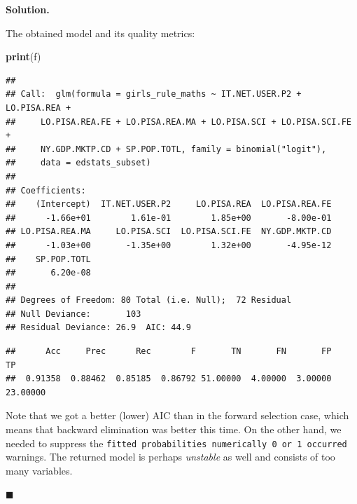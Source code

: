\documentclass[10pt,b5paper,krantz1]{krantz}
\newenvironment{Shaded}{\begin{snugshade}}{\end{snugshade}}
\newcommand{\DataTypeTok}[1]{\textcolor[rgb]{0.27,0.27,0.27}{#1}}
\newcommand{\FloatTok}[1]{\textcolor[rgb]{0.06,0.06,0.06}{#1}}
\newcommand{\KeywordTok}[1]{\textcolor[rgb]{0.27,0.27,0.27}{\textbf{#1}}}
\newcommand{\NormalTok}[1]{#1}
\newcommand{\OperatorTok}[1]{\textcolor[rgb]{0.43,0.43,0.43}{\textbf{#1}}}
\newcommand{\StringTok}[1]{\textcolor[rgb]{0.5,0.5,0.5}{#1}}
\newenvironment{solution}{%
\bigskip\noindent\textbf{Solution. }%
\it\ignorespaces%
\ignorespaces%
}{\ignorespaces%
\hfill$\blacksquare$%
}
\begin{document}
\begin{solution}
The obtained model and its quality metrics:

\begin{Shaded}
\begin{Highlighting}[]
\KeywordTok{print}\NormalTok{(f)}
\end{Highlighting}
\end{Shaded}

\begin{verbatim}
## 
## Call:  glm(formula = girls_rule_maths ~ IT.NET.USER.P2 + LO.PISA.REA + 
##     LO.PISA.REA.FE + LO.PISA.REA.MA + LO.PISA.SCI + LO.PISA.SCI.FE + 
##     NY.GDP.MKTP.CD + SP.POP.TOTL, family = binomial("logit"), 
##     data = edstats_subset)
## 
## Coefficients:
##    (Intercept)  IT.NET.USER.P2     LO.PISA.REA  LO.PISA.REA.FE  
##      -1.66e+01        1.61e-01        1.85e+00       -8.00e-01  
## LO.PISA.REA.MA     LO.PISA.SCI  LO.PISA.SCI.FE  NY.GDP.MKTP.CD  
##      -1.03e+00       -1.35e+00        1.32e+00       -4.95e-12  
##    SP.POP.TOTL  
##       6.20e-08  
## 
## Degrees of Freedom: 80 Total (i.e. Null);  72 Residual
## Null Deviance:       103 
## Residual Deviance: 26.9  AIC: 44.9
\end{verbatim}

\begin{Shaded}
\end{Shaded}

\begin{verbatim}
##      Acc     Prec      Rec        F       TN       FN       FP       TP 
##  0.91358  0.88462  0.85185  0.86792 51.00000  4.00000  3.00000 23.00000
\end{verbatim}

Note that we got a better (lower) AIC than in the forward selection
case, which means that backward elimination was better this time.
On the other hand, we needed to suppress the
\texttt{fitted\ probabilities\ numerically\ 0\ or\ 1\ occurred} warnings.
The returned model is perhaps \emph{unstable} as well and consists of too
many variables.

\end{solution}
\end{document}

